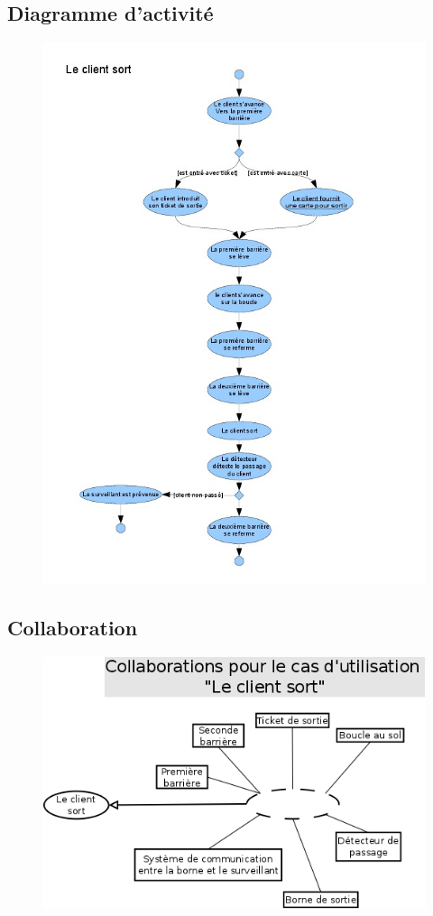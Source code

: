 \documentclass[a4paper]{article}
\begin{document}
\subsection{Diagramme d'activit\'e}
\begin{figure}[!ht]
\centering
\includegraphics[scale=.7]{imgs/act_sort.jpg}
\end{figure}
\newpage

\subsection{Collaboration}
\begin{figure}[!ht]
\centering
\includegraphics[scale=.5]{collaborations/_sort.png}
\end{figure}
\end{document}
